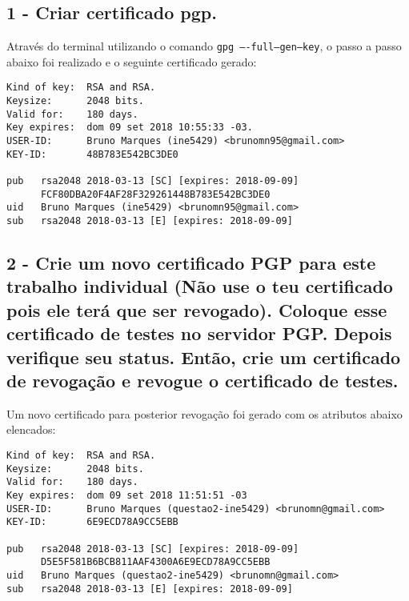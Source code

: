 \documentclass[
    article,            %
    11pt,               %
    oneside,            %
    a4paper,            %
    english,            %
    brazil,             %
    sumario=tradicional,
    ]{abntex2}
\begin{document}
\subsection*{\textbf{1 - Criar certificado pgp.}}

Através do terminal utilizando o comando \texttt{gpg ----full--gen--key}, o passo a passo abaixo foi realizado e o seguinte certificado gerado:

\begin{Verbatim}[frame=single, commandchars=\\\{\}, fontsize=\footnotesize]
Kind of key:  RSA and RSA.
Keysize:      2048 bits.
Valid for:    180 days.
Key expires:  dom 09 set 2018 10:55:33 -03.
USER-ID:      Bruno Marques (ine5429) <brunomn95@gmail.com>
KEY-ID:       48B783E542BC3DE0
    
pub   rsa2048 2018-03-13 [SC] [expires: 2018-09-09]
      FCF80DBA20F4AF28F329261448B783E542BC3DE0
uid   Bruno Marques (ine5429) <brunomn95@gmail.com>
sub   rsa2048 2018-03-13 [E] [expires: 2018-09-09]
\end{Verbatim}

\subsection*{\textbf{2 - Crie um novo certificado PGP para este trabalho individual (Não use o teu certificado pois ele terá que ser revogado). Coloque esse certificado de testes no servidor PGP. Depois verifique seu status. Então, crie um certificado de revogação e revogue o certificado de testes.}}

Um novo certificado para posterior revogação foi gerado com os atributos abaixo elencados:

\begin{Verbatim}[frame=single, commandchars=\\\{\}, fontsize=\footnotesize]
Kind of key:  RSA and RSA.
Keysize:      2048 bits.
Valid for:    180 days.
Key expires:  dom 09 set 2018 11:51:51 -03
USER-ID:      Bruno Marques (questao2-ine5429) <brunomn@gmail.com>
KEY-ID:       6E9ECD78A9CC5EBB

pub   rsa2048 2018-03-13 [SC] [expires: 2018-09-09]
      D5E5F581B6BCB811AAF4300A6E9ECD78A9CC5EBB
uid   Bruno Marques (questao2-ine5429) <brunomn@gmail.com>
sub   rsa2048 2018-03-13 [E] [expires: 2018-09-09]
\end{Verbatim}
\end{document}
